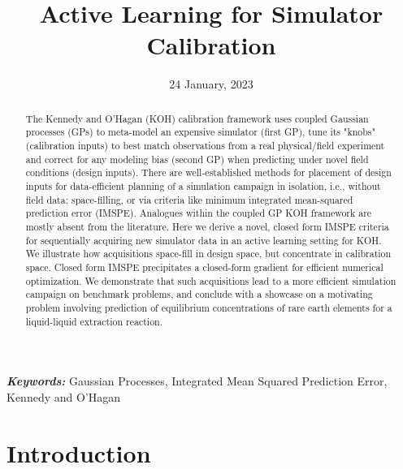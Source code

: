 \documentclass[
]{article}
\title{Active Learning for Simulator Calibration}
\author{}
\date{\vspace{-2.5em}24 January, 2023}
\begin{document}
\maketitle

\begin{abstract}

The Kennedy and O'Hagan (KOH) calibration framework uses coupled Gaussian
processes (GPs) to meta-model an expensive simulator (first GP), tune its
"knobs" (calibration inputs) to best match observations from a real
physical/field experiment and correct for any modeling bias (second GP) when
predicting under novel field conditions (design inputs). There are
well-established methods for placement of design inputs for data-efficient
planning of a simulation campaign in isolation, i.e., without field data:
space-filling, or via criteria like minimum integrated
mean-squared prediction error (IMSPE). Analogues within the coupled GP KOH
framework are mostly absent from the literature. 
Here we derive a novel, closed form IMSPE
criteria for sequentially acquiring new simulator data in an active learning
setting for KOH.  We illustrate how acquisitions space-fill in design space,
but concentrate in calibration space. Closed form IMSPE precipitates a
closed-form gradient for efficient numerical optimization.  We 
demonstrate that such acquisitions lead to a more efficient
simulation campaign on benchmark problems, and conclude with a showcase on a
motivating problem involving prediction of equilibrium concentrations of rare
earth elements for a liquid-liquid extraction reaction.

\end{abstract}

\textbf{\emph{Keywords:}} Gaussian Processes, Integrated Mean Squared Prediction Error, Kennedy and O'Hagan

\hypertarget{introduction}{%
\section{Introduction}\label{introduction}}
\end{document}
